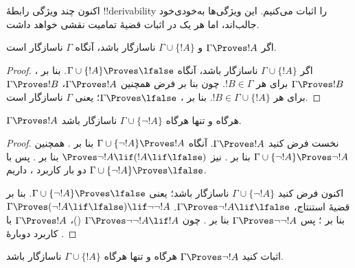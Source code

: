 \documentclass[../../../include/open-logic-section]{subfiles}
\begin{document}
      {}
      {}


اکنون چند ویژگی رابطهٔ !!{derivability} را اثبات می‌کنیم. این ویژگی‌ها
به‌خودی‌خود جالب‌اند، اما هر یک در اثبات قضیهٔ تمامیت نقشی خواهد داشت.

\begin{prop}
  اگر $\Gamma \Proves !A$ و $\Gamma \cup \{!A\}$ ناسازگار باشد، آنگاه
  $\Gamma$ ناسازگار است.
\end{prop}

\begin{proof}
  اگر $\Gamma \cup \{!A\}$ ناسازگار باشد، آنگاه
  $\Gamma \cup \{!A\} \Proves \lfalse$. بنا بر
  ، $\Gamma \Proves !B$ برای هر
  $!B \in \Gamma$. چون بنا بر فرض همچنین $\Gamma \Proves !A$،
  $\Gamma \Proves !B$ برای هر $!B \in \Gamma \cup \{!A\}$. بنا بر
  ، $\Gamma \Proves \lfalse$؛ یعنی
  $\Gamma$ ناسازگار است.
\end{proof}

\begin{prop}
$\Gamma \Proves !A$ هرگاه و تنها هرگاه $\Gamma \cup \{\lnot !A\}$
ناسازگار باشد.
\end{prop}

\begin{proof}
نخست فرض کنید $\Gamma \Proves !A$. آنگاه
$\Gamma \cup \{\lnot !A\} \Proves !A$ بنا بر
. همچنین
$\Gamma \cup \{\lnot !A\} \Proves \lnot !A$ بنا بر
. نیز
$\Proves \lnot !A \lif (!A \lif \lfalse)$ بنا بر
.
پس با دو بار کاربرد ، داریم
$\Gamma \cup \{\lnot !A\} \Proves \lfalse$.

اکنون فرض کنید $\Gamma \cup \{\lnot !A\}$ ناسازگار باشد؛ یعنی
$\Gamma \cup \{\lnot !A\} \Proves \lfalse$. بنا بر قضیهٔ استنتاج،
$\Gamma \Proves \lnot !A \lif \lfalse$.
$\Gamma \Proves (\lnot !A \lif \lfalse) \lif \lnot\lnot !A$ بنا بر
؛ پس $\Gamma \Proves \lnot\lnot !A$ بنا بر
. چون
$\Gamma \Proves \lnot\lnot !A \lif !A$
()، $\Gamma \Proves !A$ با کاربرد دوبارهٔ
.
\end{proof}

\begin{prob}
اثبات کنید $\Gamma \Proves \lnot !A$ هرگاه و تنها هرگاه
$\Gamma \cup \{!A\}$ ناسازگار باشد.
\end{prob}
\end{document}
